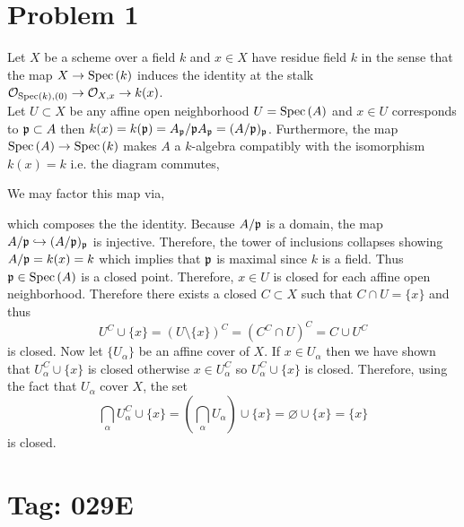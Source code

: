\documentclass[12pt]{article}
\begin{document}

\section{Problem 1}

Let $X$ be a scheme over a field $k$ and $x \in X$ have residue field $k$ in the sense that the map $X \to \mathrm{Spec}\left( k \right)$ induces the identity at the stalk $\mathcal{O}_{\mathrm{Spec}\left( k \right), (0)} \to \mathcal{O}_{X, x} \to k(x)$.  
\bigskip\\
Let $U \subset X$ be any affine open neighborhood $U = \mathrm{Spec}\left( A \right)$ and $x \in U$ corresponds to $\mathfrak{p} \subset A$ then $k(x) = k(\mathfrak{p}) = A_{\mathfrak{p}}/\mathfrak{p} A_{\mathfrak{p}} = (A / \mathfrak{p})_{\mathfrak{p}}$. Furthermore, the map $\mathrm{Spec}\left( A \right) \to \mathrm{Spec}\left( k \right)$ makes $A$ a $k$-algebra compatibly with the isomorphism $k(x) = k$ i.e. the diagram commutes,
\begin{center}
\end{center}  
We may factor this map via,
\begin{center}
\end{center}
which composes the the identity. Because $A / \mathfrak{p}$ is a domain, the map $A / \mathfrak{p} \hookrightarrow (A / \mathfrak{p})_{\mathfrak{p}}$ is injective. Therefore, the tower of inclusions collapses showing $A / \mathfrak{p} = k(x) = k$ which implies that $\mathfrak{p}$ is maximal since $k$ is a field. Thus $\mathfrak{p} \in \mathrm{Spec}\left( A \right)$ is a closed point. Therefore, $x \in U$ is closed for each affine open neighborhood. 
Therefore there exists a closed $C \subset X$ such that $C \cap U = \{ x \}$ and thus \[ U^C \cup \{ x \} = (U \setminus \{ x \})^C = (C^C \cap U)^C = C \cup U^C \]
is closed. Now let $\{ U_\alpha \}$ be an affine cover of $X$. If $x \in U_\alpha$ then we have shown that $U_\alpha^C \cup \{ x \}$ is closed otherwise $x \in U_\alpha^C$ so $U_\alpha^C \cup \{ x \}$ is closed. Therefore, using the fact that $U_\alpha$ cover $X$, the set
\[ \bigcap_{\alpha} U^C_\alpha \cup \{ x \} = \left( \bigcap_\alpha U_\alpha \right) \cup \{ x \} = \varnothing \cup \{ x \} = \{ x \} \]   
is closed.  

\section{Tag: 029E}
\end{document}
